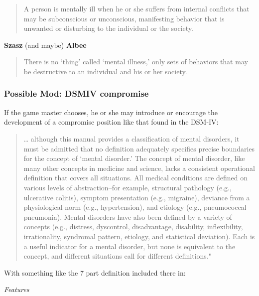 \begin{refsection}
\begin{quote}

A person is mentally ill when he or she suffers from internal conflicts that may be subconscious or unconscious, manifesting behavior that is unwanted or disturbing to the individual or the society.
\end{quote}

\textbf{Szasz} (and maybe) \textbf{Albee}

\begin{quote}

There is no `thing' called `mental illness,' only sets of behaviors that may be destructive to an individual and his or her society.
\end{quote}

\subsubsection{Possible Mod: DSMIV compromise}
\label{possiblemod:dsmivcompromise}

If the game master chooses, he or she may introduce or encourage the development of a compromise position like that found in the DSM-IV: 

\begin{quote}

{\ldots} although this manual provides a classification of mental disorders, it must be admitted that no definition adequately specifies precise boundaries for the concept of `mental disorder.' The concept of mental disorder, like many other concepts in medicine and science, lacks a consistent operational definition that covers all situations. All medical conditions are defined on various levels of abstraction--for example, structural pathology (e.g., ulcerative colitis), symptom presentation (e.g., migraine), deviance from a physiological norm (e.g., hypertension), and etiology (e.g., pneumococcal pneumonia). Mental disorders have also been defined by a variety of concepts (e.g., distress, dyscontrol, disadvantage, disability, inflexibility, irrationality, syndromal pattern, etiology, and statistical deviation). Each is a useful indicator for a mental disorder, but none is equivalent to the concept, and different situations call for different definitions." 
\end{quote}

With something like the 7 part definition included there in:

\emph{Features}

\begin{quote}


\end{quote}
\end{refsection}
